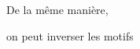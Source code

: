 \documentclass[preview]{standalone}
\begin{document}
\begin{center}
De la même manière,

on peut inverser les motifs
\end{center}
\end{document}
